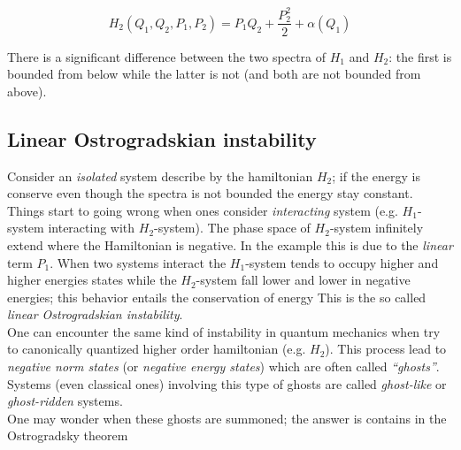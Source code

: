 \begin{equation} \label{eq: second-order_motion_eq_ham}
  H_2(Q_1, Q_2, P_1, P_2) = P_1Q_2 + \frac{P_2^2}{2} + \alpha(Q_1)
\end{equation}

There is a significant difference between the two spectra of $H_1$ and $H_2$:
the first is bounded from below while the latter is not (and both are not
bounded from above).


\subsection{Linear Ostrogradskian instability}
\label{subsection:linear_ostrogradskian_instability}
Consider an \emph{isolated} system describe by the hamiltonian $H_2$; if the
energy is conserve even though the spectra is not bounded the energy stay
constant. Things start to going wrong when ones consider \emph{interacting}
system (e.g. $H_1$-system interacting with $H_2$-system). The phase space of
$H_2$-system infinitely extend where the Hamiltonian is negative. In the example
this is due to the \emph{linear} term $P_1$. When two systems interact the
$H_1$-system tends to occupy higher and higher energies states while the
$H_2$-system fall lower and lower in negative energies; this behavior entails
the conservation of energy %
This is the so called \emph{linear Ostrogradskian instability}. \\

One can encounter the same kind of instability in quantum mechanics when try to
canonically quantized higher order hamiltonian (e.g. $H_2$). This process lead
to \emph{negative norm states} (or \emph{negative energy states}) which are
often called \emph{``ghosts''}. Systems (even classical ones) involving this
type of ghosts are called \emph{ghost-like} or \emph{ghost-ridden} systems. \\

One may wonder when these ghosts are summoned; the answer is contains in the
Ostrogradsky theorem %

